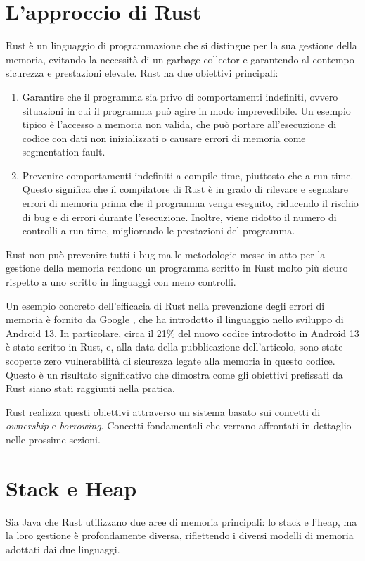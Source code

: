 \section{L'approccio di Rust}
Rust è un linguaggio di programmazione che si distingue per la sua gestione della memoria, evitando la necessità di un garbage collector e garantendo al contempo sicurezza e prestazioni elevate. Rust ha due obiettivi principali:
\begin{enumerate}
    \item  Garantire che il programma sia privo di comportamenti indefiniti, ovvero situazioni in cui il programma può agire in modo imprevedibile. Un esempio tipico è l'accesso a memoria non valida, che può portare all'esecuzione di codice con dati non inizializzati o causare errori di memoria come segmentation fault. 
    \item Prevenire comportamenti indefiniti a compile-time, piuttosto che a run-time. Questo significa che il compilatore di Rust è in grado di rilevare e segnalare errori di memoria prima che il programma venga eseguito, riducendo il rischio di bug e di errori durante l'esecuzione. Inoltre, viene ridotto il numero di controlli a run-time, migliorando le prestazioni del programma. 
\end{enumerate}
Rust non può prevenire tutti i bug ma le metodologie messe in atto per la gestione della memoria rendono un programma scritto in Rust molto più sicuro rispetto a uno scritto in linguaggi con meno controlli. 

Un esempio concreto dell'efficacia di Rust nella prevenzione degli errori di memoria è fornito da Google \cite{android13-memorysafe}, che ha introdotto il linguaggio nello sviluppo di Android 13. In particolare, circa il 21\% del nuovo codice introdotto in Android 13 è stato scritto in Rust, e, alla data della pubblicazione dell'articolo, sono state scoperte zero vulnerabilità di sicurezza legate alla memoria in questo codice. Questo è un risultato significativo che dimostra come gli obiettivi prefissati da Rust siano stati raggiunti nella pratica.

Rust realizza questi obiettivi attraverso un sistema basato sui concetti di \textit{ownership} e \textit{borrowing}. Concetti fondamentali che verrano affrontati in dettaglio nelle prossime sezioni.

\section{Stack e Heap}
Sia Java che Rust utilizzano due aree di memoria principali: lo stack e l'heap, ma la loro gestione è profondamente diversa, riflettendo i diversi modelli di memoria adottati dai due linguaggi.

